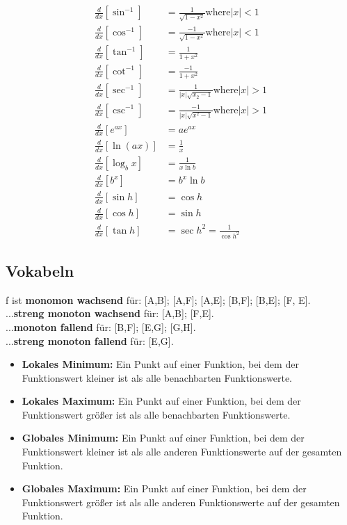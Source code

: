 \documentclass{report}
\begin{document}
\begin{align*}
    \frac{d}{dx}\left[\sin^{-1}\right]&= \frac{1}{\sqrt{1-x^2}} \text{where} |x|<1\\
    \frac{d}{dx}\left[\cos^{-1}\right]&= \frac{-1}{\sqrt{1-x^2}} \text{where} |x|<1 \\
    \frac{d}{dx}\left[\tan^{-1}\right]&=\frac{1}{1+x^2}  \\
    \frac{d}{dx}\left[\cot^{-1}\right]&= \frac{-1}{1+x^2} \\
    \frac{d}{dx}\left[\sec^{-1}\right]&=\frac{1}{|x|\sqrt{x_2-1}} \text{where} |x|>1\\
    \frac{d}{dx}\left[\csc^{-1}\right]&= \frac{-1}{|x|\sqrt{x^2-1}} \text{where} |x|>1 \\
    \frac{d}{dx}\left[e^{ax}\right]&= ae^{ax} \\
    \frac{d}{dx}\left[\ln(ax)\right]&= \frac{1}{x} \\
    \frac{d}{dx}\left[\log_bx\right]&= \frac{1}{x \ln b} \\
    \frac{d}{dx}\left[b^x\right]&= b^x \ln b \\
    \frac{d}{dx}\left[\sin h\right]&= \cos h \\
    \frac{d}{dx}\left[\cos h\right]&= \sin h \\
    \frac{d}{dx}\left[\tan h\right]&= \sec h^2= \frac{1}{\cos h^{2}}
\end{align*}

\subsection{Vokabeln}

f ist \textbf{monomon wachsend} für: [A,B]; [A,F]; [A,E]; [B,F]; [B,E]; [F, E].\\ 
...\textbf{streng monoton wachsend} für: [A,B]; [F,E].\\  
...\textbf{monoton fallend} für: [B,F]; [E,G]; [G,H].\\
...\textbf{streng monoton fallend} für: [E,G].

\begin{itemize}
\item \textbf{Lokales Minimum:} Ein Punkt auf einer Funktion, bei dem der Funktionswert kleiner ist als alle benachbarten Funktionswerte.
\item \textbf{Lokales Maximum:} Ein Punkt auf einer Funktion, bei dem der Funktionswert größer ist als alle benachbarten Funktionswerte.
\item \textbf{Globales Minimum:} Ein Punkt auf einer Funktion, bei dem der Funktionswert kleiner ist als alle anderen Funktionswerte auf der gesamten Funktion.
\item \textbf{Globales Maximum:} Ein Punkt auf einer Funktion, bei dem der Funktionswert größer ist als alle anderen Funktionswerte auf der gesamten Funktion.
\end{itemize}
\end{document}
